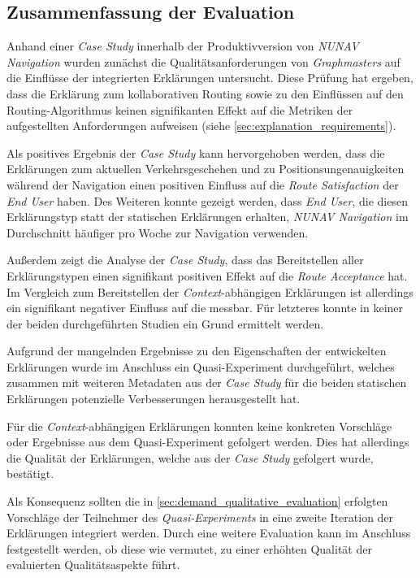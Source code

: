 \subsection{Zusammenfassung der Evaluation}

Anhand einer \textit{Case Study} innerhalb der Produktivversion von \textit{NUNAV Navigation} wurden zunächst die Qualitätsanforderungen von \textit{Graphmasters} auf die Einflüsse der integrierten Erklärungen untersucht. Diese Prüfung hat ergeben, dass die Erklärung zum kollaborativen Routing sowie zu den Einflüssen auf den Routing-Algorithmus keinen signifikanten Effekt auf die Metriken der aufgestellten Anforderungen aufweisen (siehe \autoref{sec:explanation_requirements}).

Als positives Ergebnis der \textit{Case Study} kann hervorgehoben werden, dass die Erklärungen zum aktuellen Verkehrsgeschehen und zu Positionsungenauigkeiten während der Navigation einen positiven Einfluss auf die \textit{Route Satisfaction} der \textit{End User} haben. Des Weiteren konnte gezeigt werden, dass \textit{End User}, die diesen Erklärungstyp statt der statischen Erklärungen erhalten, \textit{NUNAV Navigation} im Durchschnitt häufiger pro Woche zur Navigation verwenden.

Außerdem zeigt die Analyse der \textit{Case Study}, dass das Bereitstellen aller Erklärungstypen einen signifikant positiven Effekt auf die \textit{Route Acceptance} hat. Im Vergleich zum Bereitstellen der \textit{Context}-abhängigen Erklärungen ist allerdings ein signifikant negativer Einfluss auf die  messbar. Für letzteres konnte in keiner der beiden durchgeführten Studien ein Grund ermittelt werden.

Aufgrund der mangelnden Ergebnisse zu den Eigenschaften der entwickelten Erklärungen wurde im Anschluss ein Quasi-Experiment durchgeführt, welches zusammen mit weiteren Metadaten aus der \textit{Case Study} für die beiden statischen Erklärungen potenzielle Verbesserungen herausgestellt hat.

Für die \textit{Context}-abhängigen Erklärungen konnten keine konkreten Vorschläge oder Ergebnisse aus dem Quasi-Experiment gefolgert werden. Dies hat allerdings die Qualität der Erklärungen, welche aus der \textit{Case Study} gefolgert wurde, bestätigt.

Als Konsequenz sollten die in \autoref{sec:demand_qualitative_evaluation} erfolgten Vorschläge der Teilnehmer des \textit{Quasi-Experiments} in eine zweite Iteration der Erklärungen integriert werden. Durch eine weitere Evaluation kann im Anschluss festgestellt werden, ob diese wie vermutet, zu einer erhöhten Qualität der evaluierten Qualitätsaspekte führt.

